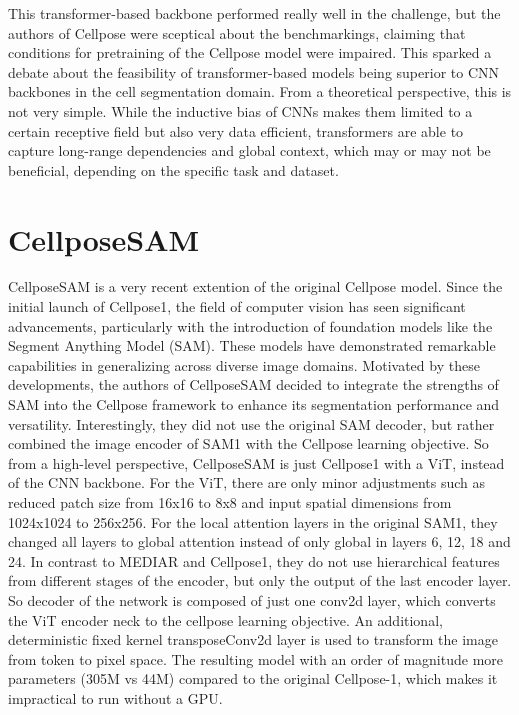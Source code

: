 This transformer-based backbone performed really well in the challenge, but the authors of Cellpose were sceptical about the benchmarkings, claiming that conditions for pretraining of the Cellpose model were impaired. This sparked a debate about the feasibility of transformer-based models being superior to CNN backbones in the cell segmentation domain. From a theoretical perspective, this is not very simple. While the inductive bias of CNNs makes them limited to a certain receptive field but also very data efficient, transformers are able to capture long-range dependencies and global context, which may or may not be beneficial, depending on the specific task and dataset.


\section{CellposeSAM}

CellposeSAM is a very recent extention of the original Cellpose model. Since the initial launch of Cellpose1, the field of computer vision has seen significant advancements, particularly with the introduction of foundation models like the Segment Anything Model (SAM). These models have demonstrated remarkable capabilities in generalizing across diverse image domains. Motivated by these developments, the authors of CellposeSAM decided to integrate the strengths of SAM into the Cellpose framework to enhance its segmentation performance and versatility. Interestingly, they did not use the original SAM decoder, but rather combined the image encoder of SAM1 with the Cellpose learning objective. So from a high-level perspective, CellposeSAM is just Cellpose1 with a ViT, instead of the CNN backbone. For the ViT, there are only minor adjustments such as reduced patch size from 16x16 to 8x8 and input spatial dimensions from 1024x1024 to 256x256. For the local attention layers in the original SAM1, they changed all layers to global attention instead of only global in layers 6, 12, 18 and 24. In contrast to MEDIAR and Cellpose1, they do not use hierarchical features from different stages of the encoder, but only the output of the last encoder layer. So decoder of the network is composed of just one conv2d layer, which converts the ViT encoder neck to the cellpose learning objective. An additional, deterministic fixed kernel transposeConv2d layer is used to transform the image from token to pixel space. The resulting model with an order of magnitude more parameters (305M vs 44M) compared to the original Cellpose-1, which makes it impractical to run without a GPU. 

